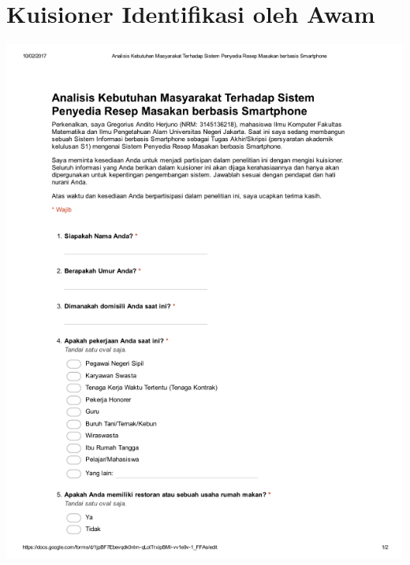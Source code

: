 \chapter{Kuisioner Identifikasi oleh Awam}
\includegraphics[width=1\textwidth]{pdf/hal_1_masyarakat}



